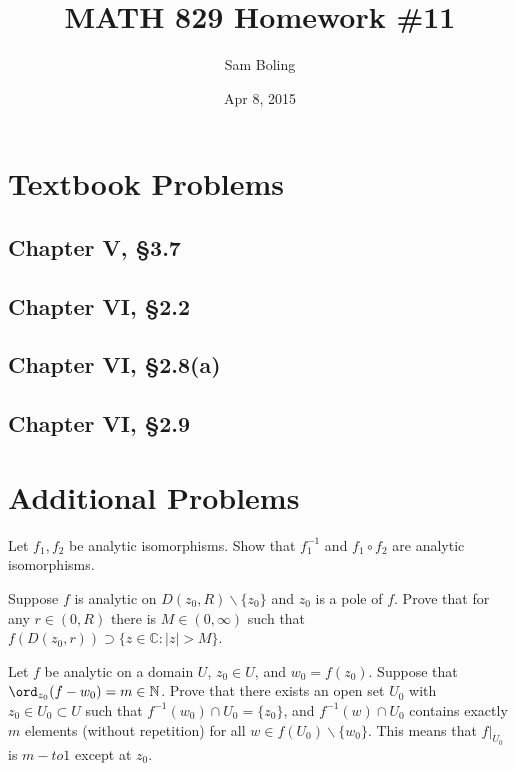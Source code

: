 \documentclass{article}
\title{MATH 829 Homework \#11}
\date{Apr 8, 2015}
\author{Sam Boling}
\newcounter{Problem}
\newenvironment{Problem}{\begin{Exercise}[name={Problem},
                                          counter={Problem}]}
                        {\end{Exercise}}
\begin{document}
\begin{titlepage}
\maketitle
\end{titlepage}

\section{Textbook Problems}
\subsection*{Chapter V, \S 3.7}

\subsection*{Chapter VI, \S 2.2}

\subsection*{Chapter VI, \S 2.8(a)}

\subsection*{Chapter VI, \S 2.9}

\section{Additional Problems}
\begin{Problem}
Let $f_1, f_2$ be analytic isomorphisms. Show that
$f_1^{-1}$ and $f_1 \circ f_2$ are analytic isomorphisms.
\end{Problem}

\begin{Problem}
Suppose $f$ is analytic on $D(z_0, R) \backslash \{ z_0 \}$
and $z_0$ is a pole of $f$. Prove that for any $r \in (0, R)$
there is $M \in (0, \infty)$ such that
$f(D(z_0, r)) \supset \{ z \in \mathbb{C} : |z| > M \}$.
\end{Problem}

\begin{Problem}
Let $f$ be analytic on a domain $U$, $z_0 \in U$, and $w_0 = f(z_0)$.
Suppose that $\ord_{z_0} (f - w_0) = m \in \mathbb{N}$. Prove that
there exists an open set $U_0$ with $z_0 \in U_0 \subset U$ such that
$f^{-1}(w_0) \cap U_0 = \{ z_0 \}$, and $f^{-1}(w) \cap U_0$ contains
exactly $m$ elements (without repetition) for all
$w \in f(U_0) \backslash \{ w_0 \}$. This means that $f|_{U_0}$ is
$m-to1$ except at $z_0$.
\end{Problem}
\end{document}
